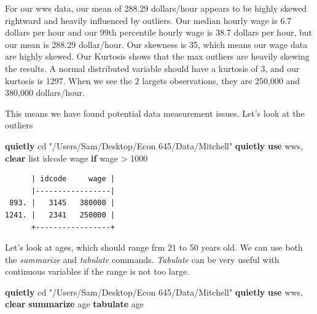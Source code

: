 \documentclass[
]{book}
\newenvironment{Shaded}{\begin{snugshade}}{\end{snugshade}}
\newcommand{\KeywordTok}[1]{\textcolor[rgb]{0.13,0.29,0.53}{\textbf{#1}}}
\newcommand{\NormalTok}[1]{#1}
\newcommand{\OtherTok}[1]{\textcolor[rgb]{0.56,0.35,0.01}{#1}}
\newcommand{\StringTok}[1]{\textcolor[rgb]{0.31,0.60,0.02}{#1}}
\begin{document}
For our wws data, our mean of 288.29 dollars/hour appears to be highly skewed rightward and heavily influenced by outliers. Our median hourly wage is 6.7 dollars per hour and our 99th percentile hourly wage is 38.7 dollars per hour, but our mean is 288.29 dollar/hour. Our skewness is 35, which means our wage data are highly skewed. Our Kurtosis shows that the max outliers are heavily skewing the results. A normal distributed variable should have a kurtosis of 3, and our kurtosis is 1297. When we see the 2 largets observations, they are 250,000 and 380,000 dollars/hour.

This means we have found potential data measurement issues. Let's look at the outliers

\begin{Shaded}
\begin{Highlighting}[]
\KeywordTok{quietly}\NormalTok{ cd }\StringTok{"/Users/Sam/Desktop/Econ 645/Data/Mitchell"}
\KeywordTok{quietly} \KeywordTok{use}\NormalTok{ wws, }\KeywordTok{clear}
\OtherTok{list}\NormalTok{ idcode wage }\KeywordTok{if}\NormalTok{ wage \textgreater{} 1000}
\end{Highlighting}
\end{Shaded}

\begin{verbatim}
      | idcode     wage |
      |-----------------|
 893. |   3145   380000 |
1241. |   2341   250000 |
      +-----------------+
\end{verbatim}

Let's look at ages, which should range frm 21 to 50 years old. We can use both
the \emph{summarize} and \emph{tabulate} commands. \emph{Tabulate} can be very useful with
continuous variables if the range is not too large.

\begin{Shaded}
\begin{Highlighting}[]
\KeywordTok{quietly}\NormalTok{ cd }\StringTok{"/Users/Sam/Desktop/Econ 645/Data/Mitchell"}
\KeywordTok{quietly} \KeywordTok{use}\NormalTok{ wws, }\KeywordTok{clear}
\KeywordTok{summarize}\NormalTok{ age}
\KeywordTok{tabulate}\NormalTok{ age}
\end{Highlighting}
\end{Shaded}
\end{document}
